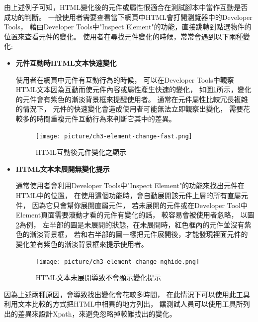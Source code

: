 由上述例子可知，HTML變化後的元件或屬性很適合在測試腳本中當作互動是否成功的判斷。
一般使用者需要查看當下網頁中HTML會打開瀏覽器中的Developer Tools，
藉由Developer Tools中"Inspect Element"的功能，直接跳轉到點選物件的位置來查看元件的變化。
使用者在尋找元件變化的時候，常常會遇到以下兩種變化:

\begin{itemize}
    \item\textbf{元件互動時HTML文本快速變化}

    使用者在網頁中元件有互動行為的時候，
    可以在Developer Tools中觀察HTML文本因為互動而使元件內容或屬性產生快速的變化，
    如圖\ref{f3.2}所示，變化的元件會有紫色的漸淡背景框來提醒使用者。
    通常在元件屬性比較冗長複雜的情況下，
    元件的快速變化會造成使用者可能無法立即觀察出變化，
    需要花較多的時間重複元件互動行為來判斷它其中的差異。

    \begin{figure}[H]
        \centering
        \texttt{[image: picture/ch3-element-change-fast.png]}
        \caption{HTML互動後元件變化之顯示}
        \label{f3.2}
    \end{figure}
    
    \item\textbf{HTML文本未展開無變化提示}

    通常使用者會利用Developer Tools中"Inspect Element"的功能來找出元件在HTML中的位置，
    在使用這個功能時，會自動展開該元件上層的所有直屬元件，
    因為它只會幫你展開直屬元件，
    若未展開的元件或在Developer Tool中Element頁面需要滾動才看的元件有變化的話，
    較容易會被使用者忽略，
    以圖\ref{f3.3}為例，
    左半部的圖是未展開的狀態，在未展開時，紅色框內的元件並沒有紫色的漸淡背景框，
    若和右半部的圖一樣把元件展開後，才能發現裡面元件的變化並有紫色的漸淡背景框來提示使用者。

    \begin{figure}[H]
        \centering
        \texttt{[image: picture/ch3-element-change-nghide.png]}
        \caption{HTML文本未展開導致不會顯示變化提示}
        \label{f3.3}
    \end{figure}
    
\end{itemize}

因為上述兩種原因，會導致找出變化會花較多時間，
在此情況下可以使用此工具利用文本比較的方式把HTML中相異的地方列出，
讓測試人員可以使用工具所列出的差異來設計Xpath，來避免忽略掉較難找出的變化。

